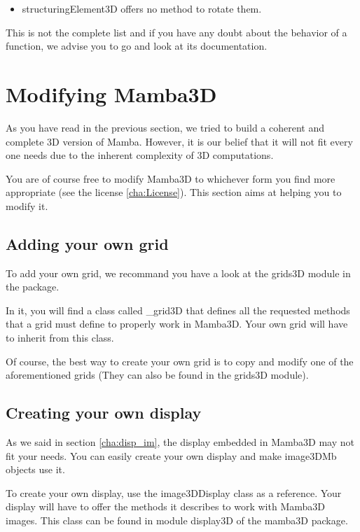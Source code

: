 \documentclass[a4paper,10pt,oneside]{article}
\begin{document}
\begin{itemize}
\item structuringElement3D offers no method to rotate them.
\end{itemize}

This is not the complete list and if you have any doubt about the behavior
of a function, we advise you to go and look at its documentation.

\pagebreak

\section{Modifying Mamba3D}

As you have read in the previous section, we tried to build a coherent and
complete 3D version of Mamba. However, it is our belief that it will not fit
every one needs due to the inherent complexity of 3D computations.

You are of course free to modify Mamba3D to whichever form you find more
appropriate (see the license \ref{cha:License}). This section aims at helping
you to modify it.

\subsection{Adding your own grid}
\label{cha:create_grid}

To add your own grid, we recommand you have a look at the grids3D module in
the package.

In it, you will find a class called \_grid3D that defines all the requested
methods that a grid must define to properly work in Mamba3D. Your own grid
will have to inherit from this class.

Of course, the best way to create your own grid is to copy and modify one
of the aforementioned grids (They can also be found in the grids3D module).

\subsection{Creating your own display}
\label{cha:create_disp}

As we said in section \ref{cha:disp_im}, the display embedded in Mamba3D may
not fit your needs. You can easily create your own display and make
image3DMb objects use it.

To create your own display, use the image3DDisplay class as a reference. Your
display will have to offer the methods it describes to work with Mamba3D
images. This class can be found in module display3D of the mamba3D package.
\end{document}
